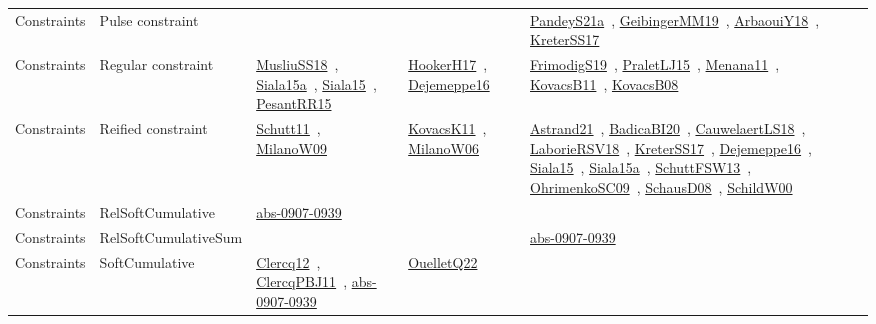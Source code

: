 {\begin{longtable}{lp{3cm}>{\raggedright\arraybackslash}p{6cm}>{\raggedright\arraybackslash}p{6cm}>{\raggedright\arraybackslash}p{8cm}}
Constraints & Pulse constraint &  &  & \href{../works/PandeyS21a.pdf}{PandeyS21a}~\cite{PandeyS21a}, \href{../works/GeibingerMM19.pdf}{GeibingerMM19}~\cite{GeibingerMM19}, \href{../works/ArbaouiY18.pdf}{ArbaouiY18}~\cite{ArbaouiY18}, \href{../works/KreterSS17.pdf}{KreterSS17}~\cite{KreterSS17}\\
Constraints & Regular constraint & \href{../works/MusliuSS18.pdf}{MusliuSS18}~\cite{MusliuSS18}, \href{../works/Siala15a.pdf}{Siala15a}~\cite{Siala15a}, \href{../works/Siala15.pdf}{Siala15}~\cite{Siala15}, \href{../works/PesantRR15.pdf}{PesantRR15}~\cite{PesantRR15} & \href{../works/HookerH17.pdf}{HookerH17}~\cite{HookerH17}, \href{../works/Dejemeppe16.pdf}{Dejemeppe16}~\cite{Dejemeppe16} & \href{../works/FrimodigS19.pdf}{FrimodigS19}~\cite{FrimodigS19}, \href{../works/PraletLJ15.pdf}{PraletLJ15}~\cite{PraletLJ15}, \href{../works/Menana11.pdf}{Menana11}~\cite{Menana11}, \href{../works/KovacsB11.pdf}{KovacsB11}~\cite{KovacsB11}, \href{../works/KovacsB08.pdf}{KovacsB08}~\cite{KovacsB08}\\
Constraints & Reified constraint & \href{../works/Schutt11.pdf}{Schutt11}~\cite{Schutt11}, \href{../works/MilanoW09.pdf}{MilanoW09}~\cite{MilanoW09} & \href{../works/KovacsK11.pdf}{KovacsK11}~\cite{KovacsK11}, \href{../works/MilanoW06.pdf}{MilanoW06}~\cite{MilanoW06} & \href{../works/Astrand21.pdf}{Astrand21}~\cite{Astrand21}, \href{../works/BadicaBI20.pdf}{BadicaBI20}~\cite{BadicaBI20}, \href{../works/CauwelaertLS18.pdf}{CauwelaertLS18}~\cite{CauwelaertLS18}, \href{../works/LaborieRSV18.pdf}{LaborieRSV18}~\cite{LaborieRSV18}, \href{../works/KreterSS17.pdf}{KreterSS17}~\cite{KreterSS17}, \href{../works/Dejemeppe16.pdf}{Dejemeppe16}~\cite{Dejemeppe16}, \href{../works/Siala15.pdf}{Siala15}~\cite{Siala15}, \href{../works/Siala15a.pdf}{Siala15a}~\cite{Siala15a}, \href{../works/SchuttFSW13.pdf}{SchuttFSW13}~\cite{SchuttFSW13}, \href{../works/OhrimenkoSC09.pdf}{OhrimenkoSC09}~\cite{OhrimenkoSC09}, \href{../works/SchausD08.pdf}{SchausD08}~\cite{SchausD08}, \href{../works/SchildW00.pdf}{SchildW00}~\cite{SchildW00}\\
Constraints & RelSoftCumulative & \href{../works/abs-0907-0939.pdf}{abs-0907-0939}~\cite{abs-0907-0939} &  & \\
Constraints & RelSoftCumulativeSum &  &  & \href{../works/abs-0907-0939.pdf}{abs-0907-0939}~\cite{abs-0907-0939}\\
Constraints & SoftCumulative & \href{../works/Clercq12.pdf}{Clercq12}~\cite{Clercq12}, \href{../works/ClercqPBJ11.pdf}{ClercqPBJ11}~\cite{ClercqPBJ11}, \href{../works/abs-0907-0939.pdf}{abs-0907-0939}~\cite{abs-0907-0939} & \href{../works/OuelletQ22.pdf}{OuelletQ22}~\cite{OuelletQ22} & \\

\end{longtable}}
